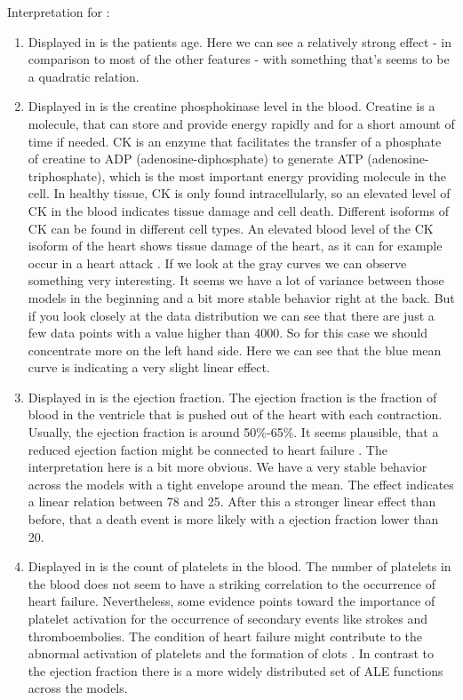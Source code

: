 \documentclass[11pt,
  a4paper,
  parskip=half, %
  BCOR=10mm, %
  english,
  ]{article}
\begin{document}
Interpretation for :
\begin{enumerate}[label=(\alph*)]
    \item Displayed in  is the patients age. Here we can see a relatively strong effect - in comparison to most of the other features - with something that's seems to be a quadratic relation. 
    \item Displayed in  is the creatine phosphokinase level in the blood.
    Creatine is a molecule, that can store and provide energy rapidly and for a short amount of time if needed. CK is an enzyme that facilitates the transfer of a phosphate of creatine to ADP (adenosine-diphosphate) to generate ATP (adenosine-triphosphate), which is the most important energy providing molecule in the cell. In healthy tissue, CK is only found intracellularly, so an elevated level of CK in the blood indicates tissue damage and cell death. Different isoforms of CK can be found in different cell types. An elevated blood level of the CK isoform of the heart shows tissue damage of the heart, as it can for example occur in a heart attack \cite{heinrich2014lofflerpetrides}. 
    If we look at the gray curves we can observe something very interesting. It seems we have a lot of variance between those models in the beginning and a bit more stable behavior right at the back. But if you look closely at the data distribution we can see that there are just a few data points with a value higher than 4000. So for this case we should concentrate more on the left hand side. Here we can see that the blue mean curve is indicating a very slight linear effect.  
    \item Displayed in  is the ejection fraction. 
    The ejection fraction is the fraction of blood in the ventricle that is pushed out of the heart with each contraction. Usually, the ejection fraction is around 50\%-65\%. It seems plausible, that a reduced ejection faction might be connected to heart failure \cite{TMV}.
    The interpretation here is a bit more obvious. We have a very stable behavior across the models with a tight envelope around the mean. The effect indicates a linear relation between 78 and 25. After this a stronger linear effect than before, that a death event is more likely with a ejection fraction lower than 20. 
    \item Displayed in  is the  count of platelets in the blood. 
    The number of platelets in the blood does not seem to have a striking correlation to the occurrence of heart failure. Nevertheless, some evidence points toward the importance of platelet activation for the occurrence of secondary events like strokes and thromboembolies. The condition of heart failure might contribute to the abnormal activation of platelets and the formation of clots \cite{10.1093/eurheartj/ehl305}. 
    In contrast to the ejection fraction there is a more widely distributed set of ALE functions across the models. 
\end{enumerate}
\end{document}
